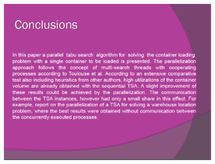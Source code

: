 \documentclass{beamer}
\begin{document}
\begin{frame}
\frametitle{ }
\begin{figure}[!th]
\begin{center}
\includegraphics[width=1\textwidth]{img/picn16.eps}
\end{center}
\end{figure}
\end{frame}
\end{document}
